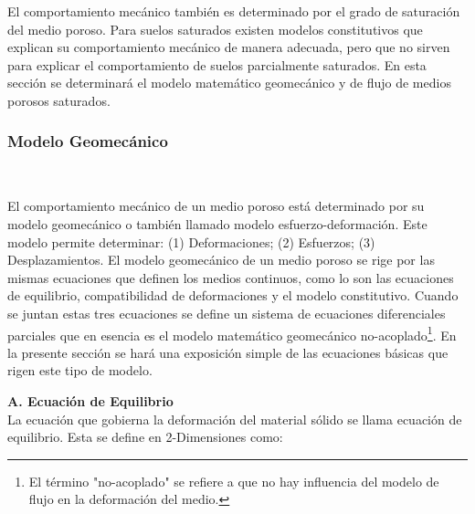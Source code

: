 El comportamiento mecánico también es determinado por el grado de saturación del medio poroso. Para suelos saturados existen modelos constitutivos que explican su comportamiento mecánico de manera adecuada, pero que no sirven para explicar el comportamiento de suelos parcialmente saturados. En esta sección se determinará el modelo matemático geomecánico y de flujo de medios porosos saturados.\bigskip 


\subsubsection{Modelo Geomecánico}~\hypertarget{sec:sec3311}{}
\label{sec:sec3311}

El comportamiento mecánico de un medio poroso está determinado por su modelo geomecánico o también llamado modelo esfuerzo-deformación. Este modelo permite determinar: (1) Deformaciones; (2) Esfuerzos; (3) Desplazamientos. El modelo geomecánico de un medio poroso se rige por las mismas ecuaciones que definen los medios continuos, como lo son las ecuaciones de equilibrio, compatibilidad de deformaciones y el modelo constitutivo. Cuando se juntan estas tres ecuaciones se define un sistema de ecuaciones diferenciales parciales que en esencia es el modelo matemático geomecánico no-acoplado\footnote{El término "no-acoplado" se refiere a que no hay influencia del modelo de flujo en la deformación del medio.}. En la presente sección se hará una exposición simple de las ecuaciones básicas que rigen este tipo de modelo.\vspace{1cm}


\textbf{A. Ecuación de Equilibrio}
\\
La ecuación que gobierna la deformación del material sólido se llama ecuación de equilibrio. Esta se define en 2-Dimensiones como:

